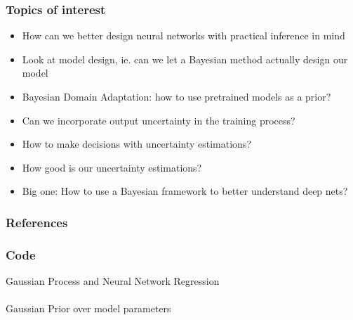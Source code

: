 \documentclass{beamer}
\newcommand{\myhref}[3][blue]{\href{#2}{\texttt{\color{#1}{#3}}}}%
\begin{document}
\begin{frame}
  \frametitle{Topics of interest}
  \begin{itemize}
  \item How can we better design neural networks with practical inference in mind
  \item Look at model design, ie. can we let a Bayesian method actually design our model
  \item Bayesian Domain Adaptation: how to use pretrained models as a prior?
  \item Can we incorporate output uncertainty in the training process?
  \item How to make decisions with uncertainty estimations?
  \item How good is our uncertainty estimations?
  \item Big one: How to use a Bayesian framework to better understand deep nets?
  \end{itemize}
\end{frame}
% 
% 
% 
% 
\begin{frame}[allowframebreaks]
  \frametitle{References}
  \printbibliography
\end{frame}
%
%
%
%
\begin{frame}
  \frametitle{Code}
  Gaussian Process and Neural Network Regression
  \\
  \myhref{https://github.com/ethangoan/regression}{https://github.com/ethangoan/regression}
  \\
  \vspace*{0.5cm}
  Gaussian Prior over model parameters
  \\
  \myhref{https://github.com/ethangoan/bayesian_nn}{https://github.com/ethangoan/bayesian\_nn}
\end{frame}
\end{document}
